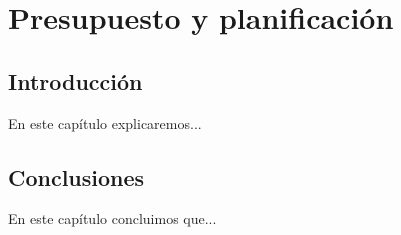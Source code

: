 \chapter{Presupuesto y planificación}\label{cap:presupuesto}

\section{Introducción}
En este capítulo explicaremos...

\section{Conclusiones}
En este capítulo concluimos que...